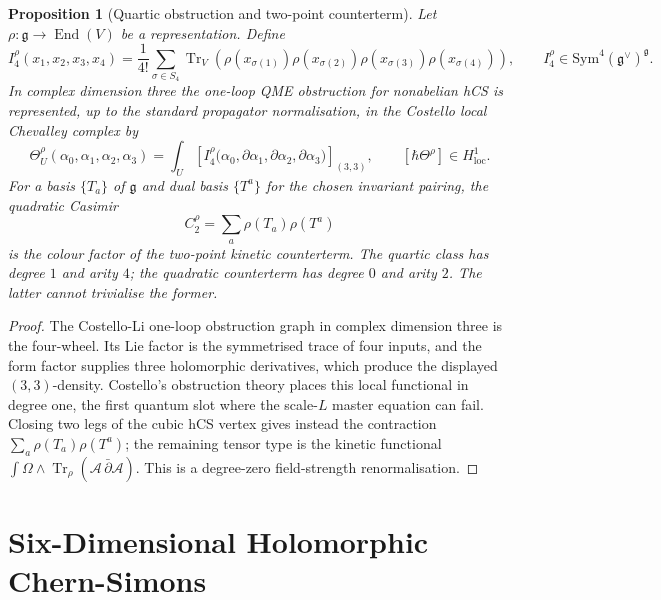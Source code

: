 \documentclass[11pt]{amsart}
\providecommand{\dbar}{\bar{\partial}}
\providecommand{\gfrak}{\mathfrak{g}}
\providecommand{\cA}{\mathcal{A}}
\providecommand{\Sym}{\mathrm{Sym}}
\theoremstyle{plain}
\newtheorem{proposition}[theorem]{Proposition}
\theoremstyle{definition}
\theoremstyle{remark}
\begin{document}
\begin{proposition}[Quartic obstruction and two-point counterterm]
\label{prop:quartic-anomaly-counterterm}
Let $\rho:\gfrak\to\operatorname{End}(V)$ be a representation.  Define
\[
  I_4^\rho(x_1,x_2,x_3,x_4)
  =
  \frac{1}{4!}\sum_{\sigma\in S_4}
  \operatorname{Tr}_V\!\left(
    \rho(x_{\sigma(1)})\rho(x_{\sigma(2)})
    \rho(x_{\sigma(3)})\rho(x_{\sigma(4)})
  \right),
  \qquad
  I_4^\rho\in\Sym^4(\gfrak^\vee)^\gfrak .
\]
In complex dimension three the one-loop QME obstruction for nonabelian
hCS is represented, up to the standard propagator normalisation, in the
Costello local Chevalley complex by
\[
  \Theta^\rho_U(\alpha_0,\alpha_1,\alpha_2,\alpha_3)
  =
  \int_U
  \left[
  I_4^\rho\bigl(
    \alpha_0,\partial\alpha_1,\partial\alpha_2,\partial\alpha_3
  \bigr)
  \right]_{(3,3)},
  \qquad
  [\hbar\Theta^\rho]\in H^1_{\mathrm{loc}}.
\]
For a basis $\{T_a\}$ of $\gfrak$ and dual basis $\{T^a\}$ for the
chosen invariant pairing, the quadratic Casimir
\[
  C_2^\rho=\sum_a\rho(T_a)\rho(T^a)
\]
is the colour factor of the two-point kinetic counterterm.  The quartic
class has degree \(1\) and arity \(4\); the quadratic counterterm has
degree \(0\) and arity \(2\).  The latter cannot trivialise the former.
\end{proposition}

\begin{proof}
The Costello-Li one-loop obstruction graph in complex dimension three
is the four-wheel.  Its Lie factor is the symmetrised trace of four
inputs, and the form factor supplies three holomorphic derivatives,
which produce the displayed \((3,3)\)-density.  Costello's obstruction
theory places this local functional in degree one, the first quantum
slot where the scale-\(L\) master equation can fail.  Closing two legs
of the cubic hCS vertex gives instead the contraction
\(\sum_a\rho(T_a)\rho(T^a)\); the remaining tensor type is the kinetic
functional \(\int\Omega\wedge\operatorname{Tr}_\rho(\cA\,\dbar\cA)\).
This is a degree-zero field-strength renormalisation.
\end{proof}

\section{Six-Dimensional Holomorphic Chern-Simons}
\label{sec:reduction}
\end{document}
